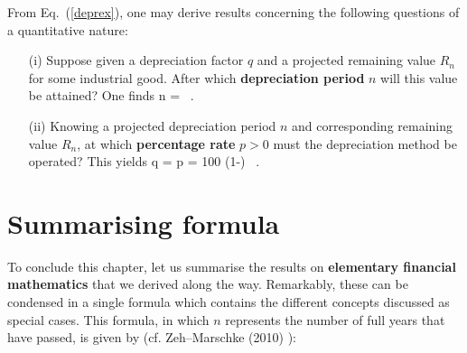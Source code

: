 \medskip
\noindent
{}From Eq.~(\ref{deprex}), one may derive results concerning the 
following questions of a quantitative nature:

%
\begin{itemize}

\item[(i)] Suppose given a depreciation factor $q$ and a projected 
remaining value $R_{n}$ for some industrial good. After which {\bf 
depreciation period} $n$ will this value be attained? One finds
%
\be
n =  \ .
\ee
%

\item[(ii)] Knowing a projected depreciation period $n$ and 
corresponding remaining value $R_{n}$, at which {\bf percentage 
rate} $p>0$ must the depreciation method be operated? This yields
%
\be
q = 
\quad\Rightarrow\quad
p = 100 \cdot \left(1-\right) \ .
\ee
%

\end{itemize}
%

\section[Summarising formula]{Summarising formula}
To conclude this chapter, let us summarise the results on {\bf 
elementary financial mathematics} that we derived along the way. 
Remarkably, these can be condensed in a single formula which 
contains the different concepts discussed as special cases. This 
formula, in which $n$ represents the number of full years that 
have passed, is given by (cf. Zeh--Marschke (2010) ):
%
\be
{}
\ee
%

